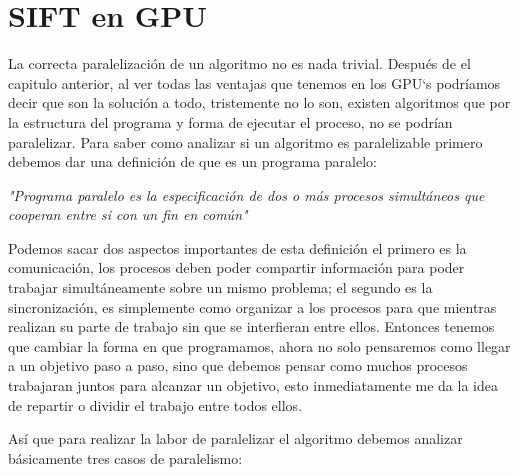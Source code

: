 
\chapter{ SIFT en GPU}

La correcta paralelización de un algoritmo no es nada trivial. Después de el capitulo anterior, al ver todas las ventajas que tenemos en los GPU`s podríamos decir que son la solución a todo, tristemente no lo son, existen algoritmos que por la estructura del programa y forma de ejecutar el proceso, no se podrían paralelizar. Para saber como analizar si un algoritmo es paralelizable primero debemos dar una definición de que es un programa paralelo:

\begin{center}
\textit{"Programa paralelo es la especificación de dos o más procesos simultáneos que cooperan entre si con un fin en común"}
\end{center}

Podemos sacar dos aspectos importantes de esta definición el primero es la comunicación, los procesos deben poder compartir información  para poder trabajar simultáneamente sobre un mismo problema; el segundo es la sincronización, es simplemente como organizar a los procesos para que mientras realizan su parte de trabajo sin que se interfieran entre ellos.
Entonces tenemos que cambiar la forma en que programamos, ahora no solo pensaremos como llegar a un objetivo paso a paso, sino  que debemos pensar como muchos procesos trabajaran juntos para alcanzar un objetivo, esto inmediatamente me da la idea de repartir o dividir el trabajo entre todos ellos. 

\pagebreak

Así que para realizar la labor de paralelizar el algoritmo debemos analizar básicamente tres casos de paralelismo:
 
